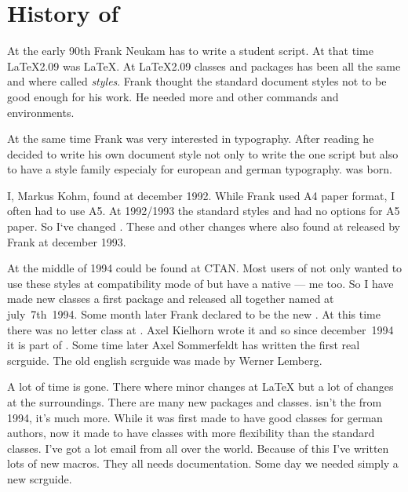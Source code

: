 \section{History of \KOMAScript}\label{sec:introduction.history}

\begin{Explain}
  At the early 90th Frank Neukam has to write a student script. At
  that time \LaTeX2.09 was \LaTeX. At \LaTeX2.09 classes and packages
  has been all the same and where called \emph{styles}. Frank thought
  the standard document styles not to be good enough for his work. He
  needed more and other commands and environments.

  At the same time Frank was very interested in typography. After
  reading \cite{JTsch87} he decided to write his own document style
  not only to write the one script but also to have a style family
  especialy for european and german typography. \Script{} was born.

  I, Markus Kohm, found {\Script} at december 1992. While Frank used
  A4 paper format, I often had to use A5. At 1992/1993 the standard
  styles and \Script{} had no options for A5 paper. So I`ve changed
  \Script{}. These and other changes where also found at \ScriptII{}
  released by Frank at december 1993. 
  
  At the middle of 1994 \LaTeXe{} could be found at CTAN. Most users
  of \ScriptII{} not only wanted to use these styles at compatibility
  mode of \LaTeXe{} but have a native \LaTeXe{} \Script{} --- me too.
  So I have made new \LaTeXe{} classes a first package and released all
  together named \KOMAScript{} at july~7th~1994. Some month later
  Frank declared \KOMAScript{} to be the new \Script. At this time
  there was no letter class at \KOMAScript{}. Axel Kielhorn wrote it
  and so since december~1994 it is part of \KOMAScript{}. Some time
  later Axel Sommerfeldt has written the first real scrguide. The
  old english scrguide was made by Werner Lemberg.

  A lot of time is gone. There where minor changes at \LaTeX{} but a
  lot of changes at the surroundings. There are many new packages and
  classes. \KOMAScript{} isn't the \KOMAScript{} from 1994, it's much
  more. While it was first made to have good classes for german
  authors, now it made to have classes with more flexibility than the
  standard classes. I've got a lot email from all over the
  world. Because of this I've written lots of new macros. They all
  needs documentation. Some day we needed simply a new scrguide. 
\end{Explain}

